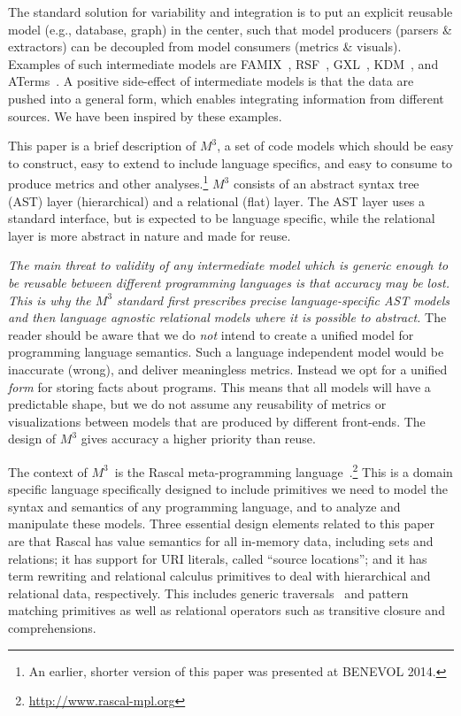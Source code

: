 \documentclass[conference]{IEEEtran}
\newcommand{\mthree}{\ensuremath{M^3}\!\xspace}
\begin{document}
The standard solution for variability and integration is to put an explicit
reusable model (e.g., database, graph) in the center, such that model
producers (parsers \& extractors) can be decoupled from model consumers
(metrics \& visuals). Examples of such intermediate models are
FAMIX~\cite{famix}, RSF~\cite{Mueller88}, GXL~\cite{HWS00}, KDM~\cite{omg-kdm},
and ATerms~\cite{BJKO00}. A positive side-effect of intermediate models
is that the data are pushed into a general form, which enables integrating
information from different sources. We have been inspired by these examples.

This paper is a brief description of \mthree, a set of code models which
should be easy to construct, easy to extend to include language specifics, and
easy to consume to produce metrics and other analyses.\!\footnote{An earlier,
shorter version of this paper was presented at BENEVOL 2014.} \mthree consists of an abstract syntax tree (AST) layer
(hierarchical) and a relational (flat) layer. The AST layer uses a standard
interface, but is expected to be language specific, while the relational layer
is more abstract in nature and made for reuse.

\emph{The main threat to validity of any intermediate model which is generic
enough to be reusable between different programming languages is that accuracy
may be lost. This is why the \mthree standard first prescribes precise
language-specific AST models and then language agnostic relational models
where it is possible to abstract.} The reader should be aware that we do
\emph{not} intend to create a unified model for programming language
semantics. Such a language independent model would be inaccurate (wrong), and
deliver meaningless metrics. Instead we opt for a unified \emph{form} for
storing facts about programs. This means that all models will have a
predictable shape, but we do not assume any reusability of metrics or
visualizations between models that are produced by different front-ends. The
design of \mthree  gives accuracy a higher priority than reuse.



The context of \mthree\ is the Rascal meta-programming language~\cite{KvdSV-
Rascal11,rascalscam}.\footnote{\url{http://www.rascal-mpl.org}} This is a
domain specific language specifically designed to include primitives we need
to model the syntax and semantics of any programming language, and to analyze
and manipulate these models. Three essential design elements related to this
paper are that Rascal has value semantics for all in-memory data, including
sets and relations; it has support for URI literals, called ``source
locations''; and it has term rewriting and relational calculus primitives to
deal with hierarchical and relational data, respectively. This includes
generic traversals~\cite{Traversals} and pattern matching primitives as well
as relational operators such as transitive closure and comprehensions.
\end{document}
